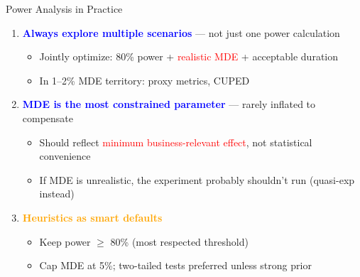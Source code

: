 \documentclass{beamer}
\newcommand{\blue}[1]{\textcolor{blue}{#1}}
\newcommand{\red}[1]{\textcolor{red}{#1}}
\newcommand{\orange}[1]{\textcolor{orange}{#1}}
\begin{document}
\begin{frame}{Power Analysis in Practice }

\begin{enumerate}

    \item \textbf{\blue{Always explore multiple scenarios}} --- not just one power calculation
    \begin{itemize}
        \item Jointly optimize: 80\% power + \red{realistic MDE} + acceptable duration
        \item In 1--2\% MDE territory: proxy metrics, CUPED
    \end{itemize}
    \vspace{0.2cm}

    \item \textbf{\blue{MDE is the most constrained parameter}} --- rarely inflated to compensate
    \begin{itemize}
        \item Should reflect \red{minimum business-relevant effect}, not statistical convenience
        \item If MDE is unrealistic, the experiment probably shouldn't run (quasi-exp instead)
    \end{itemize}

    \vspace{0.2cm}

    \item \textbf{\orange{Heuristics as smart defaults}}
    \begin{itemize}
        \item Keep power $\geq$ 80\% (most respected threshold)
        \item Cap MDE at 5\%; two-tailed tests preferred unless strong prior
    \end{itemize}

\end{enumerate}

\end{frame}
\end{document}
